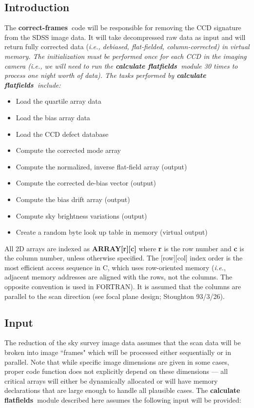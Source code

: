 \def\cfrm{{\bf correct-frames\ }}
\def\icfrm{{\bf calculate flatfields\ }}
\subsection{Introduction}

The \cfrm code will be responsible
for removing the CCD signature from the SDSS image data. It will
take decompressed raw data as input and will return fully
corrected data (\it i.e.\rm, debiased, flat-fielded, column-corrected) 
in virtual memory. The initialization
must be performed once for each CCD in the imaging camera (i.e., we
will need to run the \icfrm module 30 times to process one night
worth of data). The tasks performed by \icfrm include: 

\begin{itemize}

\item Load the quartile array data
\item Load the bias array data
\item Load the CCD defect database 
\item Compute the corrected mode array
\item Compute the normalized, inverse flat-field array (output)
\item Compute the corrected de-bias vector (output)
\item Compute the bias drift array (output)
\item Compute sky brightness variations (output)
\item Create a random byte look up table in memory (virtual output)

\end{itemize}

All 2D arrays are indexed as {\bf ARRAY[r][c]} where {\bf r} is
the row number and {\bf c} is the column number, unless 
otherwise specified. The [row][col] index order is the most efficient
access sequence in C, which uses row-oriented memory ({\it i.e.},
adjacent memory addresses are aligned with the rows, not the
columns. The opposite convention is used in FORTRAN).
It is assumed that the columns are parallel to the scan direction (see
focal plane design; Stoughton 93/3/26). 

\subsection{Input}

The reduction of the sky survey image data assumes that
the scan data will be broken into image ``frames"
which will be processed either sequentially or in parallel.
Note that while specific image dimensions are given in some
cases, proper code function does not explicitly depend on
these dimensions --- all critical arrays will either be
dynamically allocated or will have memory declarations that
are large enough to handle all plausible cases.
The \icfrm module described here assumes the following input
will be provided:

